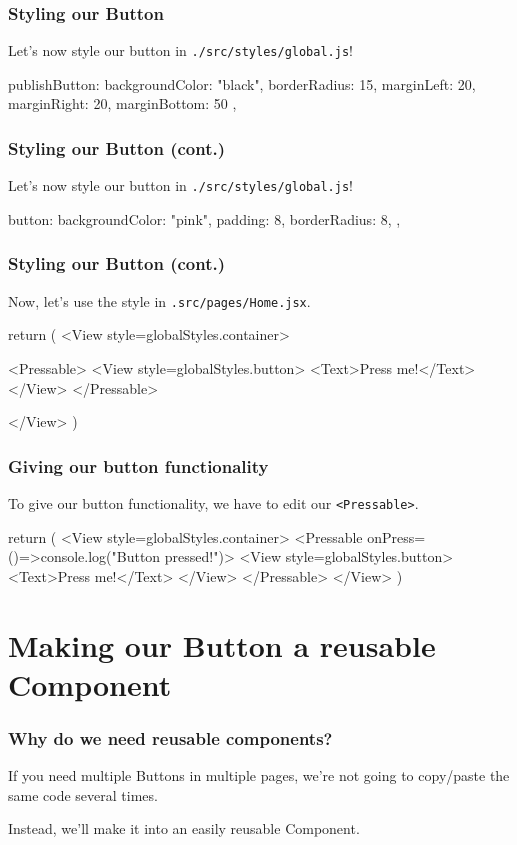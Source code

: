 \documentclass{beamer}
\begin{document}
  \begin{frame}[fragile]
    \frametitle{Styling our Button}
    Let's now style our button in \verb|./src/styles/global.js|!

    \vspace{0.5cm}
    \begin{jscodesmall}
publishButton: {
  backgroundColor: "black",
  borderRadius: 15,
  marginLeft: 20,
  marginRight: 20,
  marginBottom: 50
},
    \end{jscodesmall}
  \end{frame}
  \begin{frame}[fragile]
    \frametitle{Styling our Button (cont.)}
    Let's now style our button in \verb|./src/styles/global.js|!

    \vspace{0.5cm}
    \begin{jscodesmall}
button: {
  backgroundColor: "pink",
  padding: 8,
  borderRadius: 8,
},
    \end{jscodesmall}
  \end{frame}
  \begin{frame}[fragile]
    \frametitle{Styling our Button (cont.)}
    Now, let's use the style in \verb|.src/pages/Home.jsx|.

    \vspace{0.5cm}
    \begin{jscodesmall}
return (
  <View style={globalStyles.container}>

    <Pressable>
        <View style={globalStyles.button}>
          <Text>Press me!</Text>
        </View>
    </Pressable>

  </View>
)
    \end{jscodesmall}
  \end{frame}

  \begin{frame}[fragile]
    \frametitle{Giving our button functionality}
    To give our button functionality, we have to edit our \verb|<Pressable>|. 

    \vspace{0.5cm}
    \begin{jscodesmall}
return (
  <View style={globalStyles.container}>
    <Pressable onPress={()=>{console.log("Button pressed!")}}>
      <View style={globalStyles.button}>
        <Text>Press me!</Text>
      </View>
    </Pressable>
  </View>
)
    \end{jscodesmall}
  \end{frame}

  \section{Making our Button a reusable Component}
  \begin{frame}[fragile]
    \frametitle{Why do we need reusable components?}
    
    If you need multiple Buttons in multiple pages, we're not going to copy/paste the same code several times.
    
    Instead, we'll make it into an easily reusable Component. 
  \end{frame}
\end{document}
